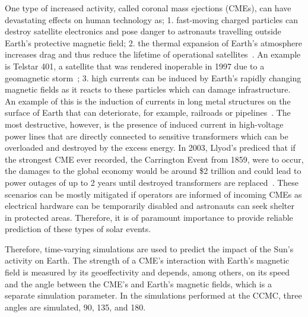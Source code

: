 One type of increased activity, called coronal mass ejections (CMEs), can have devastating effects on human technology as;  1. fast-moving charged particles can destroy satellite electronics and pose danger to astronauts travelling outside Earth's protective magnetic field;  2. the thermal expansion of Earth's atmosphere increases drag and thus reduce the lifetime of operational satellites~\cite{knowles2001effect}.  An example is Telstar 401, a satellite that was rendered inoperable in 1997 due to a geomagnetic storm~\cite{sabol1998analysis};  3. high currents can be induced by Earth's rapidly changing magnetic fields as it reacts to these particles which can damage infrastructure.  An example of this is the induction of currents in long metal structures on the surface of Earth that can deteriorate, for example, railroads or pipelines~\cite{pirjola1999power}.  The most destructive, however, is the presence of induced current in high-voltage power lines that are directly connected to sensitive transformers which can be overloaded and destroyed by the excess energy.  In 2003, Llyod's prediced that if the strongest CME ever recorded, the Carrington Event from 1859, were to occur, the damages to the global economy would be around \$2 trillion and could lead to power outages of up to 2 years until destroyed transformers are replaced~\cite{maynard2013solar}.  These scenarios can be mostly mitigated if operators are informed of incoming CMEs as electrical hardware can be temporarily disabled and astronauts can seek shelter in protected areas.  Therefore, it is of paramount importance to provide reliable prediction of these types of solar events.

Therefore, time-varying simulations are used to predict the impact of the Sun's activity on Earth.  The strength of a CME's interaction with Earth's magnetic field is measured by its geoeffectivity and depends, among others, on its speed and the angle between the CME's and Earth's magnetic fields, which is a separate simulation parameter.  In the simulations performed at the CCMC, three angles are simulated, 90\textdegree , 135\textdegree , and 180\textdegree .

